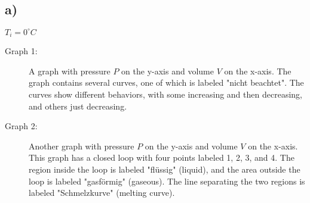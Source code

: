 

\subsection*{a)}
$T_i = 0^\circ C$

\begin{description}
    \item[Graph 1:] A graph with pressure $P$ on the y-axis and volume $V$ on the x-axis. The graph contains several curves, one of which is labeled "nicht beachtet". The curves show different behaviors, with some increasing and then decreasing, and others just decreasing.
\end{description}

\begin{description}
    \item[Graph 2:] Another graph with pressure $P$ on the y-axis and volume $V$ on the x-axis. This graph has a closed loop with four points labeled 1, 2, 3, and 4. The region inside the loop is labeled "flüssig" (liquid), and the area outside the loop is labeled "gasförmig" (gaseous). The line separating the two regions is labeled "Schmelzkurve" (melting curve).
\end{description}